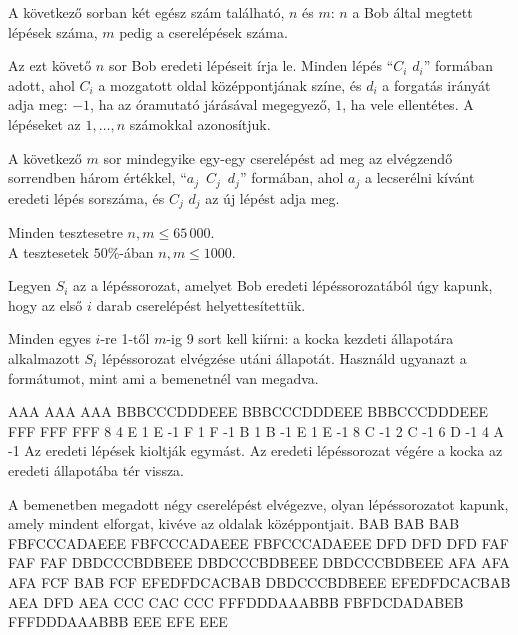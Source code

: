 A következő sorban két egész szám található, $n$ és $m$: $n$ a Bob által megtett lépések száma, $m$ pedig a cserelépések száma.

Az ezt követő $n$ sor Bob eredeti lépéseit írja le. Minden lépés ``$C_i$ $d_i$'' formában adott, ahol $C_i$ a mozgatott oldal középpontjának színe, és $d_i$ a forgatás irányát adja meg: $-1$, ha az óramutató járásával megegyező, $1$, ha vele ellentétes. A lépéseket az $1, \ldots, n$ számokkal azonosítjuk.

A következő $m$ sor mindegyike egy-egy cserelépést ad meg az elvégzendő sorrendben három értékkel, \mbox{``$a_j$ $C_j$ $d_j$''} formában, ahol $a_j$ a lecserélni kívánt eredeti lépés sorszáma, és $C_j$ $d_j$ az új lépést adja meg.


\noindent Minden tesztesetre $n,m \leq 65\,000$.\\
A tesztesetek $50\%$-ában $n,m \leq 1000$.


Legyen $S_i$ az a lépéssorozat, amelyet Bob eredeti lépéssorozatából úgy kapunk, hogy az első $i$ darab cserelépést helyettesítettük.

Minden egyes $i$-re 1-től $m$-ig 9 sort kell kiírni: a kocka kezdeti állapotára alkalmazott $S_i$ lépéssorozat elvégzése utáni állapotát. Használd ugyanazt a formátumot, mint ami a bemenetnél van megadva.


\sampleIN
AAA
AAA
AAA
BBBCCCDDDEEE
BBBCCCDDDEEE
BBBCCCDDDEEE
FFF
FFF
FFF
8 4
E 1
E -1
F 1
F -1
B 1
B -1
E 1
E -1
8 C -1
2 C -1
6 D -1
4 A -1
\sampleCOMMENT
Az eredeti lépések kioltják egymást. Az eredeti lépéssorozat végére a kocka az eredeti állapotába tér vissza.

A bemenetben megadott négy cserelépést elvégezve, olyan lépéssorozatot kapunk, amely mindent elforgat, kivéve az oldalak középpontjait.
\sampleOUT
BAB
BAB
BAB
FBFCCCADAEEE
FBFCCCADAEEE
FBFCCCADAEEE
DFD
DFD
DFD
FAF
FAF
FAF
DBDCCCBDBEEE
DBDCCCBDBEEE
DBDCCCBDBEEE
AFA
AFA
AFA
FCF
BAB
FCF
EFEDFDCACBAB
DBDCCCBDBEEE
EFEDFDCACBAB
AEA
DFD
AEA
CCC
CAC
CCC
FFFDDDAAABBB
FBFDCDADABEB
FFFDDDAAABBB
EEE
EFE
EEE
\sampleEND


